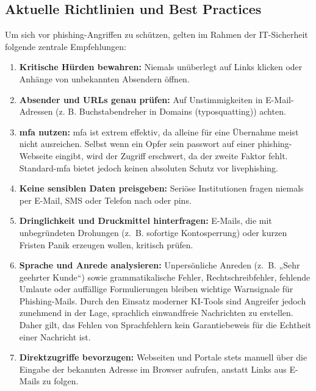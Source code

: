 \documentclass[12pt,a4paper]{article}
\begin{document}
\subsection{Aktuelle Richtlinien und Best Practices}
Um sich vor \gls{phishing}-Angriffen zu schützen, gelten im Rahmen der IT-Sicherheit folgende zentrale Empfehlungen:

\begin{enumerate}
    \item \textbf{Kritische Hürden bewahren:} Niemals unüberlegt auf Links klicken oder \mbox{Anhänge} von unbekannten Absendern öffnen. \cite{cisaphishingpostcard}\cite{bacsphishing}
    \item \textbf{Absender und URLs genau prüfen:} Auf Unstimmigkeiten in E-Mail-Adressen (z. B. Buchstabendreher in Domains (\gls{typosquatting})) achten. \cite{cisaphishingpostcard}\cite{bacsphishing}
    \item \textbf{\gls{mfa} nutzen:} \gls{mfa} ist extrem effektiv, da  alleine für eine Übernahme meist nicht ausreichen. Selbst wenn ein Opfer sein \gls{passwort} auf einer \gls{phishing}-Webseite eingibt, wird der Zugriff erschwert, da der zweite Faktor fehlt. Standard-\gls{mfa} bietet jedoch keinen absoluten Schutz vor \gls{livephishing}. \cite{cisaphishingpostcard}
    \item \textbf{Keine sensiblen Daten preisgeben:} Seriöse Institutionen fragen niemals per E-Mail, SMS oder Telefon nach  oder \gls{pin}s. \cite{bacsphishing}
    \item \textbf{Dringlichkeit und Druckmittel hinterfragen:} E-Mails, die mit \mbox{unbegründeten} Drohungen (z.~B. sofortige Kontosperrung) oder kurzen Fristen Panik erzeugen \mbox{wollen}, kritisch prüfen. \cite{cisaphishingpostcard}
    \item \textbf{Sprache und Anrede analysieren:} Unpersönliche Anreden (z.~B. „Sehr \mbox{geehrter} Kunde“) sowie grammatikalische Fehler, Rechtschreibfehler, fehlende Umlaute oder auffällige Formulierungen bleiben wichtige Warnsignale für Phishing-Mails. Durch den Einsatz moderner KI-Tools sind Angreifer jedoch zunehmend in der Lage, sprachlich einwandfreie Nachrichten zu erstellen. Daher gilt, das Fehlen von Sprachfehlern kein Garantiebeweis für die Echtheit einer Nachricht ist. \cite{cisaphishingpostcard}
    \item \textbf{Direktzugriffe bevorzugen:} Webseiten und Portale stets manuell über die \mbox{Eingabe} der bekannten Adresse im Browser aufrufen, anstatt Links aus E-Mails zu folgen. \cite{cisaphishingpostcard}\cite{bacsphishing}
\end{enumerate}
\end{document}
